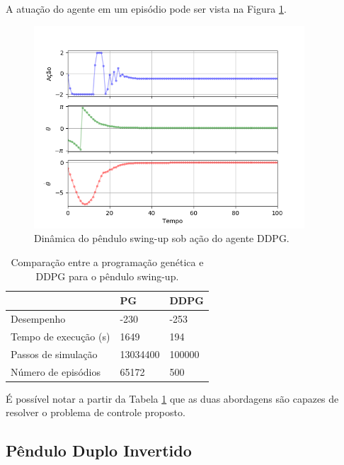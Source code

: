 A atuação do agente em um episódio pode ser vista na Figura \ref{fig:4ec-pendulumddpgvargraf}.

\begin{figure}[H]
	\centering
	\includegraphics[width=0.9\textwidth]{02_desenvolvimento/04_EC_Fig_PendulumDDPGVarGraf.png}
	\caption{Dinâmica do pêndulo swing-up sob ação do agente DDPG.}
	\label{fig:4ec-pendulumddpgvargraf}
\end{figure}

\begin{table}[H]
	\centering
	\begin{tabular}{l|l|l} \toprule
		{} & {PG} & {{DDPG}} \\ \midrule
		{Desempenho} & {-230} & {-253} \\
		{Tempo de execução (s)} & {1649} & {194} \\
		{Passos de simulação} & {13034400} & {100000} \\
		{Número de episódios} & {65172} & {500} \\
		\bottomrule
	\end{tabular}
	\caption{Comparação entre a programação genética e DDPG para o pêndulo swing-up.}\label{tab:4ec-pendulumcomp}
\end{table}

É possível notar a partir da Tabela \ref{tab:4ec-pendulumcomp} que as duas abordagens são capazes de resolver o problema de controle proposto.

\subsection{Pêndulo Duplo Invertido}\label{ssec:4ec-dp}

